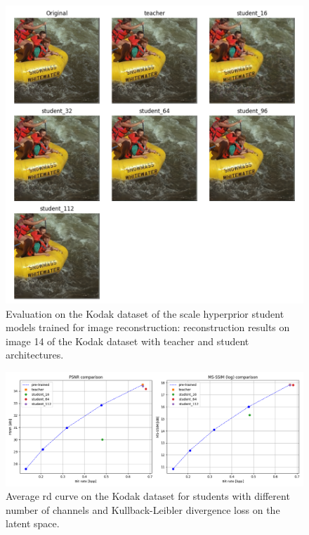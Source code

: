 \begin{figure}
    \centering
    \includegraphics[width=15cm]{../img/kd_ae_kodak_14.png}
    \caption[Evaluation on the Kodak dataset of the scale hyperprior student models trained for image reconstruction: reconstruction results on image 14 of the Kodak dataset with teacher and student architectures.]{Evaluation on the Kodak dataset of the scale hyperprior student models trained for image reconstruction: reconstruction results on image 14 of the Kodak dataset with teacher and student architectures.}
    \label{appendix:kd_ae_1:a}
\end{figure}

\begin{figure}
    \centering
    \includegraphics[width=15cm]{../img/kd_lic_rd_channels_kld.png}
    \caption[Average \acrshort{rd} curve on the Kodak dataset for students with different number of channels and Kullback-Leibler divergence loss on the latent space.]{Average \acrshort{rd} curve on the Kodak dataset for students with different number of channels and Kullback-Leibler divergence loss on the latent space.}
    \label{appendix:kd_lic_1_kld}
\end{figure}

